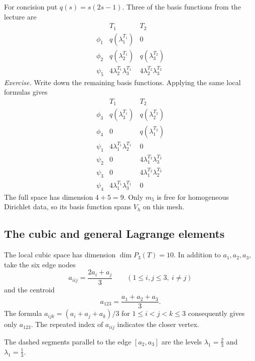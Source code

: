 \documentclass[11pt,a4paper]{article}
\begin{document}
For concision put \(q(s)=s(2s-1)\). Three of the basis functions from the lecture are
\[
\begin{array}{c|cc}
 &T_1&T_2\\\hline
 \phi_1&q(\lambda_1^{T_1})&0\\
 \phi_2&q(\lambda_2^{T_1})&q(\lambda_3^{T_2})\\
 \psi_5&4\lambda_2^{T_1}\lambda_3^{T_1}
        &4\lambda_2^{T_2}\lambda_3^{T_2}
\end{array}
\]
\textit{Exercise.} Write down the remaining basis functions. Applying the same local formulas gives
\[
\begin{array}{c|cc}
 &T_1&T_2\\\hline
 \phi_3&q(\lambda_3^{T_1})&q(\lambda_2^{T_2})\\
 \phi_4&0&q(\lambda_1^{T_2})\\
 \psi_1&4\lambda_1^{T_1}\lambda_2^{T_1}&0\\
 \psi_2&0&4\lambda_1^{T_2}\lambda_3^{T_2}\\
 \psi_3&0&4\lambda_1^{T_2}\lambda_2^{T_2}\\
 \psi_4&4\lambda_1^{T_1}\lambda_3^{T_1}&0
\end{array}
\]
The full space has dimension \(4+5=9\). Only \(m_5\) is free for homogeneous Dirichlet data, so its basis function spans \(V_h\) on this mesh.

\subsection{The cubic and general Lagrange elements}

The local cubic space has dimension \(\dim P_3(T)=10\). In addition to \(a_1,a_2,a_3\), take the six edge nodes
\[
 a_{iij}=\frac{2a_i+a_j}{3}\qquad (1\leq i,j\leq3,\ i\ne j)
\]
and the centroid
\[
 a_{123}=\frac{a_1+a_2+a_3}{3}.
\]
The formula \(a_{ijk}=(a_i+a_j+a_k)/3\) for \(1\leq i<j<k\leq3\) consequently gives only \(a_{123}\). The repeated index of \(a_{iij}\) indicates the closer vertex.

\begin{center}
\end{center}
The dashed segments parallel to the edge \([a_2,a_3]\) are the levels \(\lambda_1=\tfrac23\) and \(\lambda_1=\tfrac13\).
\end{document}
